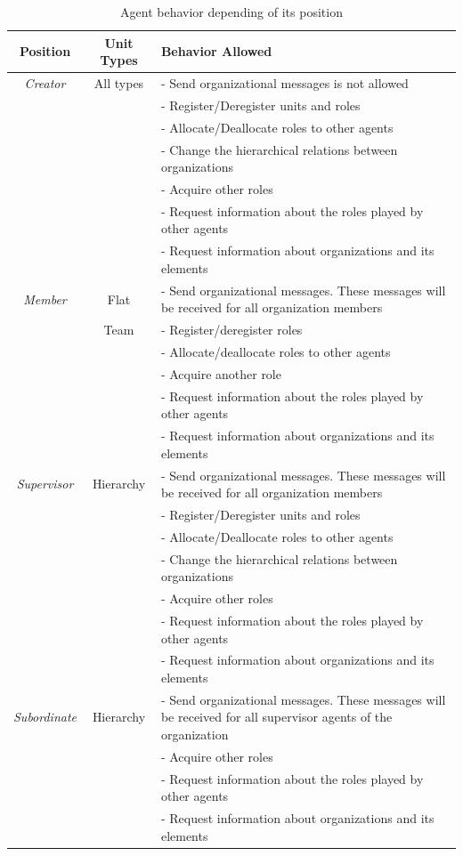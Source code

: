 \begin{table}[!ht]
\begin{tabular}{|c| c|p{11cm}|}
\hline
\textbf{Position} & Unit Types & \textbf{  Behavior Allowed } \\ \hline
\textit{Creator} & All types& - Send organizational messages is not allowed \\
 && - Register/Deregister units and roles\\
 && - Allocate/Deallocate  roles to other agents\\
 && - Change the hierarchical relations between organizations\\
 && - Acquire other roles\\
 && - Request information about the roles played by other agents\\
 && - Request information about organizations and its elements\\ \hline
\textit{Member} &Flat& - Send organizational messages. These messages will be received for all organization members\\
 &Team& - Register/deregister roles\\
 && - Allocate/deallocate roles to other agents\\
 && - Acquire another role\\
 && - Request information about the roles played by other agents\\
 && - Request information about organizations and its elements\\ \hline
\textit{Supervisor} & Hierarchy&- Send organizational messages. These messages will be received for all organization members\\
&& - Register/Deregister units and roles\\
 && - Allocate/Deallocate  roles to other agents\\
 && - Change the hierarchical relations between organizations\\
 && - Acquire other roles\\
&& - Request information about the roles played by other agents\\
 && - Request information about organizations and its elements\\ \hline
\textit{Subordinate} &Hierarchy&  - Send organizational messages. These messages will be received for all supervisor agents of the organization\\

 && - Acquire other roles\\
&& - Request information about the roles played by other agents\\
 && - Request information about organizations and its elements\\ \hline
 \end{tabular}
\caption{Agent behavior depending of its position}
\label{tab:Role_position}
\end{table}


